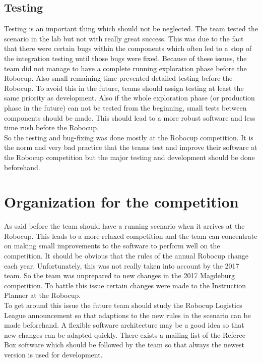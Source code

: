 \subsection{Testing}

Testing is an important thing which should not be neglected. The team tested the scenario in the lab but not with really great success. This was due to the fact that there were certain bugs within the components which often led to a stop of the integration testing until those bugs were fixed. Because of these issues, the team did not manage to have a complete running exploration phase before the Robocup. Also small remaining time prevented detailed testing before the Robocup. To avoid this in the future, teams should assign testing at least the same priority as development. Also if the whole exploration phase (or production phase in the future) can not be tested from the beginning, small tests between components should be made. This should lead to a more robust software and less time rush before the Robocup. \\

So the testing and bug-fixing was done mostly at the Robocup competition. It is the norm and very bad practice that the teams test and improve their software at the Robocup competition but the major testing and development should be done beforehand. 

 
\section{Organization for the competition}
 
As said before the team should have a running scenario when it arrives at the Robocup. This leads to a more relaxed competition and the team can concentrate on making small improvements to the software to perform well on the competition. It should be obvious that the rules of the annual Robocup change each year. Unfortunately, this was not really taken into account by the 2017 team. So the team was unprepared to new changes in the 2017 Magdeburg competition. To battle this issue certain changes were made to the Instruction Planner at the Robocup.  \\

To get around this issue the future team should study the Robocup Logistics League announcement so that adaptions to the new rules in the scenario can be made beforehand. A flexible software architecture may be a good idea so that new changes can be adapted quickly. There exists a mailing list of the Referee Box software which should be followed by the team so that always the newest version is used for development. \\

